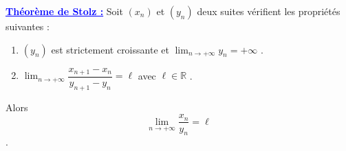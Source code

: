 \documentclass[12pt,a4paper,fleqn]{article}
\begin{document}
\begin{mybox}
\textcolor{blue}{\textbf{\underline{Théorème de Stolz :}}}\vskip3mm
Soit $(x_n)$ et $(y_n)$ deux suites vérifient les propriétés suivantes :
\begin{enumerate}
 \item $(y_n)$ est strictement croissante et $ \lim_{n\to +\infty}y_n=+\infty $ . 
 \item $ \lim_{n\to +\infty} \dfrac{x_{n+1}-x_n}{y_{n+1}-y_n}=\ell$ avec $\ell \in \mathbb R$ .
\end{enumerate}
Alors  {$$ \lim_{n\to +\infty} \dfrac{ x_n}{ y_n}=\ell$$ .}
\end{mybox}
\end{document}
